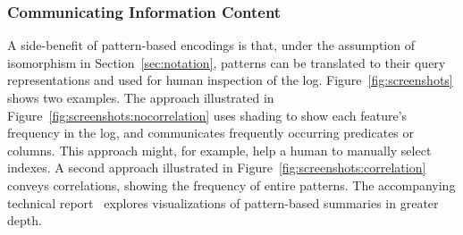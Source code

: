 \subsubsection{Communicating Information Content}
\label{sec:communicatinginformationcontent}
A side-benefit of pattern-based encodings is that, under the assumption of isomorphism in Section~\ref{sec:notation}, patterns can be translated to their query representations and used for human inspection of the log.
Figure~\ref{fig:screenshots} shows two examples.
The approach illustrated in Figure~\ref{fig:screenshots:nocorrelation} uses shading to show each feature's frequency in the log, and communicates frequently occurring predicates or columns.
This approach might, for example, help a human to manually select indexes.
A second approach illustrated in Figure~\ref{fig:screenshots:correlation} conveys correlations, showing the frequency of entire patterns.
The accompanying technical report~\cite{DBLP:journals/corr/abs-1809-00405} explores visualizations of pattern-based summaries in greater depth.


